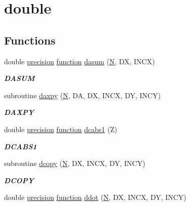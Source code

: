 \hypertarget{group__double__blas__level1}{}\section{double}
\label{group__double__blas__level1}
\subsection*{Functions}
\begin{DoxyCompactItemize}
\item 
double \hyperlink{numinquire_8h_a2c8e616467665d0b2814d4c1589ba74e}{precision} \hyperlink{afunc_8m_a7b5e596df91eadea6c537c0825e894a7}{function} \hyperlink{group__double__blas__level1_ga7372361a44de0649813750b3280c58cc}{dasum} (\hyperlink{polmisc_8c_a0240ac851181b84ac374872dc5434ee4}{N}, D\+X, I\+N\+C\+X)
\begin{DoxyCompactList}\small\item\em {\bfseries D\+A\+S\+U\+M} \end{DoxyCompactList}\item 
subroutine \hyperlink{group__double__blas__level1_ga8f99d6a644d3396aa32db472e0cfc91c}{daxpy} (\hyperlink{polmisc_8c_a0240ac851181b84ac374872dc5434ee4}{N}, D\+A, D\+X, I\+N\+C\+X, D\+Y, I\+N\+C\+Y)
\begin{DoxyCompactList}\small\item\em {\bfseries D\+A\+X\+P\+Y} \end{DoxyCompactList}\item 
double \hyperlink{numinquire_8h_a2c8e616467665d0b2814d4c1589ba74e}{precision} \hyperlink{afunc_8m_a7b5e596df91eadea6c537c0825e894a7}{function} \hyperlink{group__double__blas__level1_ga53914429b84cb315da483e71e27ed5c1}{dcabs1} (Z)
\begin{DoxyCompactList}\small\item\em {\bfseries D\+C\+A\+B\+S1} \end{DoxyCompactList}\item 
subroutine \hyperlink{group__double__blas__level1_ga21cdaae1732dea58194c279fca30126d}{dcopy} (\hyperlink{polmisc_8c_a0240ac851181b84ac374872dc5434ee4}{N}, D\+X, I\+N\+C\+X, D\+Y, I\+N\+C\+Y)
\begin{DoxyCompactList}\small\item\em {\bfseries D\+C\+O\+P\+Y} \end{DoxyCompactList}\item 
double \hyperlink{numinquire_8h_a2c8e616467665d0b2814d4c1589ba74e}{precision} \hyperlink{afunc_8m_a7b5e596df91eadea6c537c0825e894a7}{function} \hyperlink{group__double__blas__level1_ga75066c4825cb6ff1c8ec4403ef8c843a}{ddot} (\hyperlink{polmisc_8c_a0240ac851181b84ac374872dc5434ee4}{N}, D\+X, I\+N\+C\+X, D\+Y, I\+N\+C\+Y)

\end{DoxyCompactItemize}
